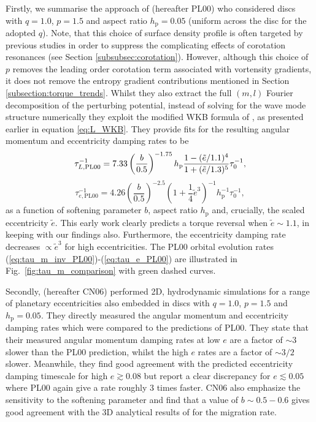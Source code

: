 Firstly, we summarise the approach of \cite{PapaloizouLarwood_2000} (hereafter PL00) who considered discs with $q=1.0$, $p=1.5$ and aspect ratio $h_\textrm{p} = 0.05$ (uniform across the disc for the adopted $q$). Note, that this choice of surface density profile is often targeted by previous studies in order to suppress the complicating effects of corotation resonances (see Section \ref{subsubsec:corotation}). However, although this choice of $p$ removes the leading order corotation term associated with vortensity gradients, it does not remove the entropy gradient contributions mentioned in Section \ref{subsection:torque_trends}. Whilst they also extract the full $(m,l)$ Fourier decomposition of the perturbing potential, instead of solving for the wave mode structure numerically they exploit the modified WKB formula of \cite{Artymowicz_1993}, as presented earlier in equation \eqref{eq:L_WKB}. They provide fits for the resulting angular momentum and eccentricity damping rates to be
%
\begin{equation}
    \label{eq:tau_m_inv_PL00}
    \tau_{L,\textrm{PL00}}^{-1} = 7.33 \left(\frac{b}{0.5}\right)^{-1.75}h_\textrm{p}\frac{1-(\Tilde{e}/1.1)^4}{1+(\Tilde{e}/1.3)^5}\tau_0^{-1} ,
\end{equation} 
%
\begin{equation}
    \label{eq:tau_e_PL00}
    \tau_{e,\textrm{PL00}}^{-1} = 4.26 \left(\frac{b}{0.5}\right)^{-2.5}\left(1+\frac{1}{4}\tilde{e}^3\right)^{-1}h_{\textrm{p}}^{-1}\tau_0^{-1},
\end{equation}
%
as a function of softening  parameter $b$, aspect ratio $h_\mathrm{p}$ and, crucially, the scaled eccentricity $\tilde{e}$. This early work clearly predicts a torque reversal when $\tilde{e}\sim 1.1$, in keeping with our findings also. Furthermore, the eccentricity damping rate decreases $\propto \tilde{e}^3$ for high eccentricities. The PL00 orbital evolution rates (\ref{eq:tau_m_inv_PL00})-(\ref{eq:tau_e_PL00}) are illustrated in Fig.~\ref{fig:tau_m_comparison} with green dashed curves.

Secondly, \cite{CresswellNelson_2006} (hereafter CN06) performed 2D, hydrodynamic simulations for a range of planetary eccentricities also embedded in discs with $q=1.0$, $p=1.5$ and $h_\textrm{p} = 0.05$. They directly measured the angular momentum and eccentricity damping rates which were compared to the predictions of PL00. They state that their measured angular momentum damping rates at low $e$ are a factor of $\sim 3$ slower than the PL00 prediction, whilst the high $e$ rates are a factor of $\sim 3/2$ slower. Meanwhile, they find good agreement with the predicted eccentricity damping timescale for high $e\gtrsim 0.08$ but report a clear discrepancy for $e\lesssim 0.05$ where PL00 again give a rate roughly 3 times faster. CN06 also emphasize the sensitivity to the softening parameter and find that a value of $b\sim 0.5-0.6$ gives good agreement with the 3D analytical results of \cite{TanakaEtAl_2002} for the migration rate. 

